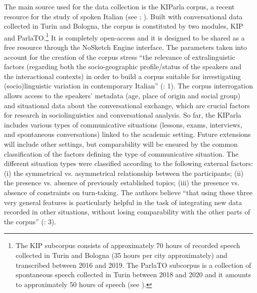 The main source used for the data collection is the KIParla corpus, a recent resource for the study of spoken Italian (see \citealt{MauriEtAl2019}; \citealt{BallarèEtAl2022}). Built with conversational data collected in Turin and Bologna, the corpus is constituted by two modules, KIP and ParlaTO.\footnote{The KIP subcorpus consists of approximately 70 hours of recorded speech collected in Turin and Bologna (35 hours per city approximately) and transcribed between 2016 and 2019. The ParlaTO subcorpus is a collection of spontaneous speech collected in Turin between 2018 and 2020 and it amounts to approximately 50 hours of speech (see \citealt{CerrutiBallarè2021}).} It is completely open-access and it is designed to be shared as a free resource through the NoSketch Engine interface. The parameters taken into account for the creation of the corpus stress “the relevance of extralinguistic factors (regarding both the socio-geographic profile/status of the speakers and the interactional contexts) in order to build a corpus suitable for investigating (socio)linguistic variation in contemporary Italian” (\citealt{MauriEtAl2019}: 1). The corpus interrogation allows access to the speakers’ metadata (age, place of origin and social group) and situational data about the conversational exchange, which are crucial factors for research in sociolinguistics and conversational analysis. So far, the KIParla includes various types of communicative situations (lessons, exams, interviews, and spontaneous conversations) linked to the academic setting. Future extensions will include other settings, but comparability will be ensured by the common classification of the factors defining the type of communicative situation. The different situation types were classified according to the following external factors: (i) the symmetrical vs. asymmetrical relationship between the participants; (ii) the presence vs. absence of previously established topics; (iii) the presence vs. absence of constraints on turn-taking. The authors believe “that using these three very general features is particularly helpful in the task of integrating new data recorded in other situations, without losing comparability with the other parts of the corpus” (\citealt{MauriEtAl2019}: 3).

